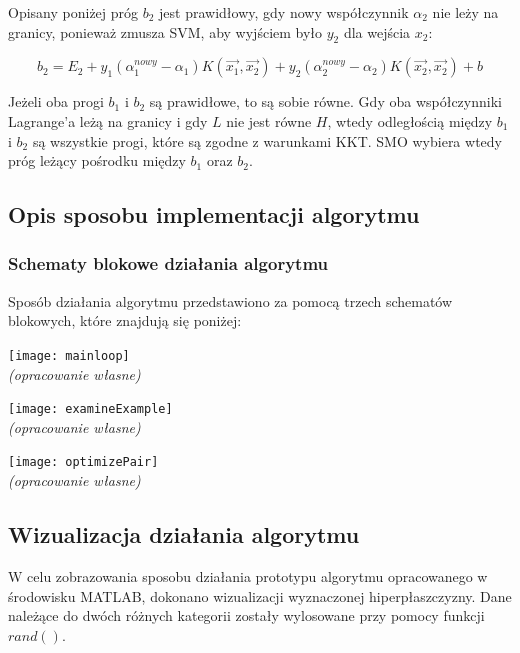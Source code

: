 \documentclass[[10pt,a4paper]{article}
\begin{document}
Opisany poniżej próg $b_2$ jest prawidłowy, gdy nowy współczynnik $\alpha_2$ nie leży na granicy, ponieważ zmusza SVM, aby wyjściem było $y_2$ dla wejścia $x_2$:

\begin{equation}
b_2 = E_2 + y_1(\alpha^{nowy}_1 - \alpha_1)K(\overrightarrow{x_1},\overrightarrow{x_2}) + y_2(\alpha^{nowy}_2 - \alpha_2)K(\overrightarrow{x_2},\overrightarrow{x_2}) + b
\end{equation}

Jeżeli oba progi $b_1$ i $b_2$ są prawidłowe, to są sobie równe. Gdy oba współczynniki Lagrange'a leżą na granicy i gdy $L$ nie jest równe $H$, wtedy odległością między $b_1$ i $b_2$ są wszystkie progi, które są zgodne z warunkami KKT. SMO wybiera wtedy próg leżący pośrodku między $b_1$ oraz $b_2$.

\subsection{Opis sposobu implementacji algorytmu}

\subsubsection{Schematy blokowe działania algorytmu}

Sposób działania algorytmu przedstawiono za pomocą trzech schematów blokowych, które znajdują się poniżej:

\begin{center}
\texttt{[image: mainloop]}\\
\textit{(opracowanie własne)}
\end{center}

\begin{center}
\texttt{[image: examineExample]}\\
\textit{(opracowanie własne)}
\end{center}

\begin{center}
\texttt{[image: optimizePair]}\\
\textit{(opracowanie własne)}
\end{center}

\subsection{Wizualizacja działania algorytmu}
W celu zobrazowania sposobu działania prototypu algorytmu opracowanego w środowisku MATLAB, dokonano wizualizacji wyznaczonej hiperpłaszczyzny. Dane należące do dwóch różnych kategorii zostały wylosowane przy pomocy funkcji $rand()$.
\end{document}
